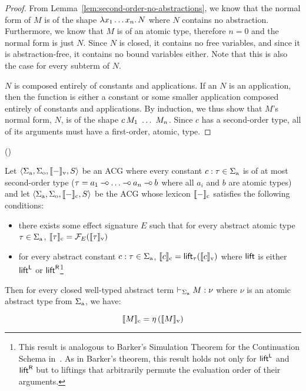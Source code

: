 \begin{proof}
  From Lemma~\ref{lem:second-order-no-abstractions}, we know that the
  normal form of $M$ is of the shape $\lambda x_1 \ldots x_n.\, N$ where $N$
  contains no abstraction. Furthermore, we know that $M$ is of an atomic
  type, therefore $n = 0$ and the normal form is just $N$. Since $N$ is
  closed, it contains no free variables, and since it is abstraction-free,
  it contains no bound variables either. Note that this is also the case
  for every subterm of $N$.
  
  $N$ is composed entirely of constants and applications. If an $N$ is an
  application, then the function is either a constant or some smaller
  application composed entirely of constants and applications. By
  induction, we thus show that $M$'s normal form, $N$, is of the shape
  $\ap{c}{M_1\ \ldots\ M_n}$. Since $c$ has a second-order type, all of its
  arguments must have a first-order, atomic, type.
\end{proof}

\begin{observation}\label{obs:conservativity-lifting}
  ()
  
  Let $\left< \Sigma_{\mathrm{a}}, \Sigma_{\mathrm{o}}, \llbracket - \rrbracket_{\mathrm{v}}, S \right>$
  be an ACG where every constant $c : \tau \in \Sigma_{\mathrm{a}}$ is of at
  most second-order type ($\tau = a_1 \mathbin{{-}\mkern-3.5mu{\circ}} \ldots \mathbin{{-}\mkern-3.5mu{\circ}} a_n \mathbin{{-}\mkern-3.5mu{\circ}} b$ where
  all $a_i$ and $b$ are atomic types) and let
  $\left< \Sigma_{\mathrm{a}}, \Sigma_{\mathrm{o}}, \llbracket - \rrbracket_{\mathrm{c}}, S \right>$ be
  the ACG whose lexicon $\llbracket - \rrbracket_{\mathrm{c}}$ satisfies the following
  conditions:

  \begin{itemize}
  \item there exists some effect signature $E$ such that for every abstract
    atomic type $\tau \in \Sigma_{\mathrm{a}}$,
    $\llbracket \tau \rrbracket_{\mathrm{c}} = \mathcal{F}_E(\llbracket \tau \rrbracket_{\mathrm{v}})$
  \item for every abstract constant $c : \tau \in \Sigma_{\mathrm{a}}$,
    $\llbracket c \rrbracket_{\mathrm{c}} = \textsf{lift}_\tau(\llbracket c \rrbracket_{\mathrm{v}})$ where $\textsf{lift}$ is either
    $\textsf{lift}^{\textsf{L}}$ or $\textsf{lift}^{\textsf{R}}$\footnote{This result is analogous to Barker's
      Simulation Theorem for the Continuation Schema
      in~\cite{barker2002continuations}. As in Barker's theorem, this
      result holds not only for $\textsf{lift}^{\textsf{L}}$ and $\textsf{lift}^{\textsf{R}}$ but to liftings that
      arbitrarily permute the evaluation order of their arguments.}
  \end{itemize}
  
  Then for every closed well-typed abstract term
  $\vdash_{\Sigma_{\mathrm{a}}} M : \nu$ where $\nu$ is an atomic abstract type
  from $\Sigma_{\mathrm{a}}$, we have:

  $$
  \llbracket M \rrbracket_{\mathrm{c}} = \eta\,(\llbracket M \rrbracket_{\mathrm{v}})
  $$
\end{observation}

